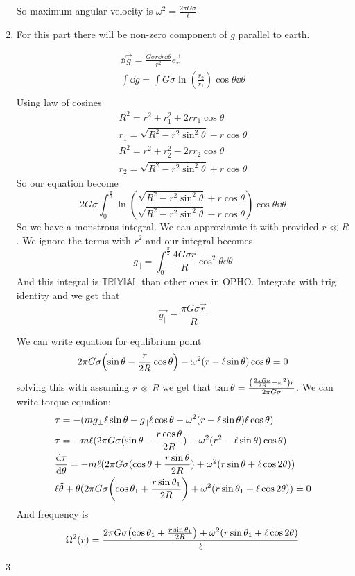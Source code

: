 \begin{sol}
\begin{enumerate}[label=\textbf{(\alph*)}]
        So maximum angular velocity is $\omega^2=\frac{2\pi G\sigma}{\ell}$
        \item
        For this part there will  be non-zero component of $g$ parallel  to earth.
        \begin{center}
        \end{center}
        \begin{align*}
        \dd \vec{g}=\frac{G\sigma r\dd r\dd \theta}{r^2}\vec{e_r}\\
        \int \dd g=\int G\sigma\ln(\frac{r_2}{r_1})\cos\theta\dd \theta\\
        \end{align*}
        Using law of cosines 
        \begin{align*}
            R^2=r^2+r_1^2+2rr_1\cos\theta\\
            r_1=\sqrt{R^2-r^2\sin^2\theta}-r\cos\theta\\
            R^2=r^2+r_2^2-2rr_2\cos\theta\\
            r_2=\sqrt{R^2-r^2\sin^2\theta}+r\cos\theta
        \end{align*}
        So our equation become
        $$2G\sigma\int_0^{\frac{\pi}{2}}\ln(\frac{\sqrt{R^2-r^2\sin^2\theta}+r\cos\theta}{\sqrt{R^2-r^2\sin^2\theta}-r\cos\theta})\cos\theta\dd \theta$$
        So we have a monstrous integral. We can approxiamte it with provided $r\ll R$. We ignore the terms with $r^2$ and our integral becomes $$g_\parallel=\int_0^{\frac{\pi}{2}}\frac{4G\sigma r}{R}\cos^2\theta\dd\theta$$
        And this integral is $\mathbb{TRIVIAL}$ than other ones in OPHO. Integrate with trig identity and we get that$$\vec{g_\parallel}=\frac{\pi G\sigma\vec{r}}{R}$$

        We can write equation for equlibrium point $$2\pi G\sigma\qty(\sin\theta-\frac{r}{2R}\cos\theta)-\omega^2(r-\ell\sin\theta)\cos\theta=0$$
        solving this with assuming $r\ll R$ we get that $\tan\theta=\frac{\qty(\frac{2\pi G\sigma}{2R}+\omega^2)r}{2\pi G\sigma}$. We can write torque equation:
        \begin{align*}
            &\tau=-(mg_\bot\ell\sin\theta-g_\parallel\ell\cos\theta-\omega^2(r-\ell\sin\theta)\ell\cos\theta)\\
            &\tau=-m\ell(2\pi G\sigma(\sin\theta-\frac{r\cos\theta}{2R})-\omega^2(r^2-\ell\sin\theta)\cos\theta)\\
            &\dv{\tau}{\theta}=-m\ell(2\pi G\sigma(\cos\theta+\frac{r\sin\theta}{2R})+\omega^2(r\sin\theta+\ell\cos 2\theta))\\
            &\ell\ddot{\theta}+\theta(2\pi G\sigma\qty(\cos\theta_1+\frac{r\sin\theta_1}{2R})+\omega^2(r\sin\theta_1+\ell\cos 2\theta))=0
        \end{align*}
        And frequency is $$\Omega^2(r)=\frac{2\pi G\sigma\qty(\cos\theta_1+\frac{r\sin\theta_1}{2R})+\omega^2(r\sin\theta_1+\ell\cos 2\theta)}{\ell}$$
        \item
    \end{enumerate}
\vspace{15mm}
\end{sol}